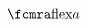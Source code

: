\documentclass[10pt]{article}
\begin{document}
\[\cmra{flex}{ a }\pdfannot height 0em{/Subtype/Text/T(LaTeX Code)/Contents(flex{ a })}\pdfannot height 2em{/Subtype/Text/T(MathML)/Contents(<mover accent='true'> <mi>flex</mi>
   <mi>a</mi>
 </mover>
)}\quad\]



\newpage
\end{document}
